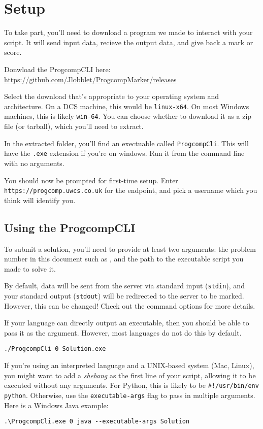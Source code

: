 \section*{Setup}

To take part, you'll need to download a program we made to interact with your script. 
It will send input data, recieve the output data, and give back a mark or score.

Donwload the ProgcompCLI here: \url{https://github.com/Jlobblet/ProgcompMarker/releases}

Select the download that's appropriate to your operating system and architecture. 
On a DCS machine, this would be \texttt{linux-x64}. 
On most Windows machines, this is likely \texttt{win-64}. 
You can choose whether to download it as a zip file (or tarball), which you'll need to extract.

In the extracted folder, you'll find an exectuable called \texttt{ProgcompCli}. 
This will have the \texttt{.exe} extension if you're on windows. Run it from the command line with no arguments.

You should now be prompted for first-time setup. Enter \texttt{https://progcomp.uwcs.co.uk} for the endpoint, and pick a username which you think will identify you.

\subsection*{Using the ProgcompCLI}

To submit a solution, you'll need to provide at least two arguments: the problem number in this document such as , and the path to the executable script you made to solve it.

By default, data will be sent from the server via standard input (\texttt{stdin}), and your standard output (\texttt{stdout}) will be redirected to the server to be marked.
However, this can be changed! Check out the command options for more details.

If your language can directly output an executable, then you should be able to pass it as the argument.
However, most languages do not do this by default.

\texttt{./ProgcompCli 0 Solution.exe}

If you're using an interpreted language and a UNIX-based system (Mac, Linux), you might want to add a \href{https://en.wikipedia.org/wiki/Shebang_(Unix)}{\em shebang} as the first line of your script, allowing it to be executed without any arguments.
For Python, this is likely to be \verb|#!/usr/bin/env python|. 
Otherwise, use the \texttt{executable-args} flag to pass in multiple arguments. Here is a Windows Java example:

\texttt{.\textbackslash ProgcompCli.exe 0 java -{}-executable-args Solution}